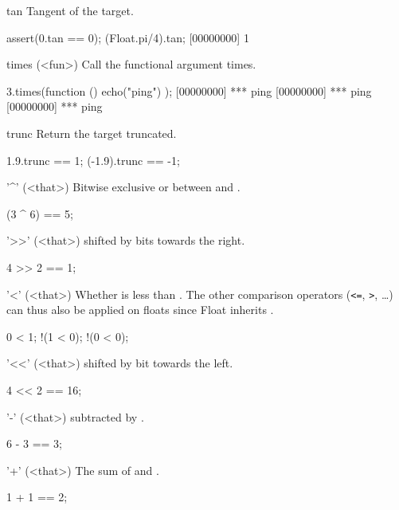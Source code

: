 \begin{urbiscriptapi}
\item[tan]
  Tangent of the target.
\begin{urbiscript}
assert(0.tan == 0);
(Float.pi/4).tan;
[00000000] 1
\end{urbiscript}

\item[times](<fun>)%
  Call the functional argument  \this times.

\begin{urbiscript}
3.times(function () { echo("ping") });
[00000000] *** ping
[00000000] *** ping
[00000000] *** ping
\end{urbiscript}


\item[trunc]
  Return the target truncated.
\begin{urbiassert}
1.9.trunc == 1;
(-1.9).trunc == -1;
\end{urbiassert}

\item['^'](<that>)%
  Bitwise exclusive or between \this and .
\begin{urbiassert}
(3 ^ 6) == 5;
\end{urbiassert}

\item['>>'](<that>)%
  \this shifted by  bits towards the right.
\begin{urbiassert}
4 >> 2 == 1;
\end{urbiassert}

\item['<'](<that>)%
  Whether \this is less than . The other comparison operators
  (\lstinline|<=|, \lstinline|>|, \ldots) can thus also be applied on floats
  since Float inherits .
\begin{urbiassert}
  0 < 1;
!(1 < 0);
!(0 < 0);
\end{urbiassert}

\item['<<'](<that>)%
  \this shifted by  bit towards the left.
\begin{urbiassert}
4 << 2 == 16;
\end{urbiassert}

\item['-'](<that>)%
  \this subtracted by .
\begin{urbiassert}
6 - 3 == 3;
\end{urbiassert}

\item['+'](<that>)%
  The sum of \this and .
\begin{urbiassert}
1 + 1 == 2;
\end{urbiassert}


\end{urbiscriptapi}
